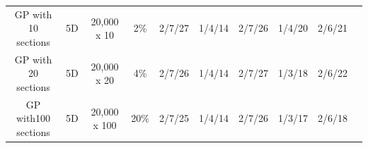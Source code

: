 \begin{table}
\begin{tabular}{cccccccccc}
		 GP with 10 sections & 5D& 20,000 x 10 & 2\% & 2/7/27  & 1/4/14 & 2/7/26 &1/4/20 & 2/6/21\\
		 GP with 20 sections & 5D& 20,000 x 20 & 4\% & 2/7/26  & 1/4/14 & 2/7/27 &1/3/18 & 2/6/22 \\
		  GP with100 sections & 5D& 20,000 x 100 & 20\% & 2/7/25  & 1/4/14 & 2/7/26 &1/3/17 & 2/6/18 \\
		  \hline
	\end{tabular}
\end{table}

